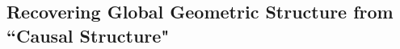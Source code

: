 \documentclass [12] {article}
\theoremstyle{plain}
\numberwithin{figure}{subsection}
\numberwithin{proposition}{subsection}
\begin{document}







\subsection{Recovering Global Geometric  Structure from ``Causal Structure"} \label{Recovering Geometric Structure}
\end{document}
